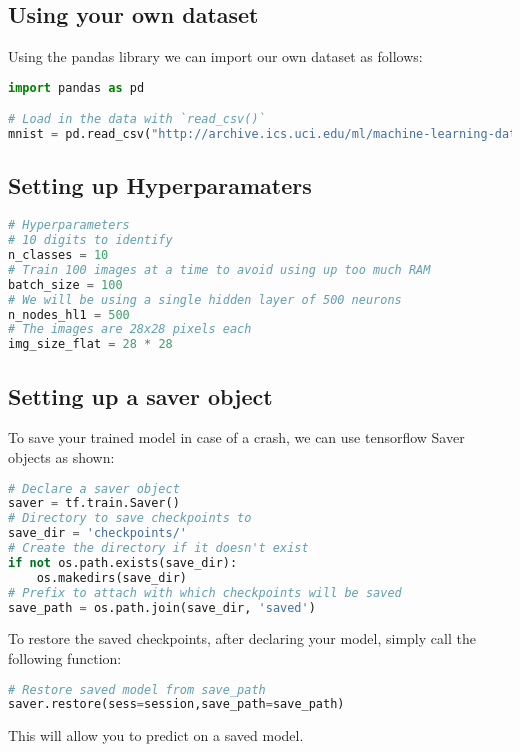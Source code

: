 \documentclass[Proceedings]{ascelike}
\begin{document}
\subsection{Using your own dataset}
Using the pandas library we can import our own dataset as follows:

\begin{lstlisting}[language=Python]
import pandas as pd

# Load in the data with `read_csv()`
mnist = pd.read_csv("http://archive.ics.uci.edu/ml/machine-learning-databases/optdigits/optdigits.tra", header=None)
\end{lstlisting}

\subsection{Setting up Hyperparamaters}
\begin{lstlisting}[language=Python]
# Hyperparameters
# 10 digits to identify
n_classes = 10
# Train 100 images at a time to avoid using up too much RAM
batch_size = 100
# We will be using a single hidden layer of 500 neurons
n_nodes_hl1 = 500
# The images are 28x28 pixels each
img_size_flat = 28 * 28
\end{lstlisting}

\subsection{Setting up a saver object}
To save your trained model in case of a crash, we can use tensorflow Saver objects as shown:

\begin{lstlisting}[language=Python]
# Declare a saver object
saver = tf.train.Saver()
# Directory to save checkpoints to
save_dir = 'checkpoints/'
# Create the directory if it doesn't exist
if not os.path.exists(save_dir):
    os.makedirs(save_dir)
# Prefix to attach with which checkpoints will be saved
save_path = os.path.join(save_dir, 'saved')
\end{lstlisting}

To restore the saved checkpoints, after declaring your model, simply call the following function:

\begin{lstlisting}[language=Python]
# Restore saved model from save_path
saver.restore(sess=session,save_path=save_path)
\end{lstlisting}

This will allow you to predict on a saved model.
\end{document}
